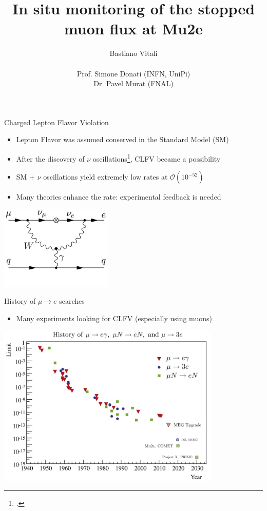 \documentclass[10pt]{beamer}
\author[Bastiano Vitali]{{\Large Bastiano Vitali}\\\ \\{\small Prof. Simone Donati (INFN, UniPi)\\ Dr. Pavel Murat (FNAL)}}
\title{In situ monitoring of the stopped muon flux at Mu2e}
\date{}
\begin{document}
\begin{frame}
\titlepage
\end{frame}

\begin{frame}{Charged Lepton Flavor Violation}
\vspace{0.3cm}
\begin{itemize}
\setlength\itemsep{0.3cm}
\item Lepton Flavor was assumed conserved in the Standard Model (SM)
\item After the discovery of $\nu$ oscillations\footcite{oscillations}, CLFV became a possibility
\item SM + $\nu$ oscillations yield extremely low rates at $\mathcal{O}(10^{-52})$ %
\item Many theories enhance the rate: experimental feedback is needed
\end{itemize}
\vspace{0.5cm}
\begin{center}
\includegraphics[width=0.4\textwidth]{feynman_mu2e}
\end{center}
\end{frame}

\begin{frame}{History of $\mu\rightarrow e$ searches}
\begin{itemize}
\item Many experiments looking for CLFV (especially using muons)
\end{itemize}
\begin{center}
\includegraphics[width=0.8\textwidth]{timeline_measures_2}
\end{center}
\end{frame}
\end{document}

